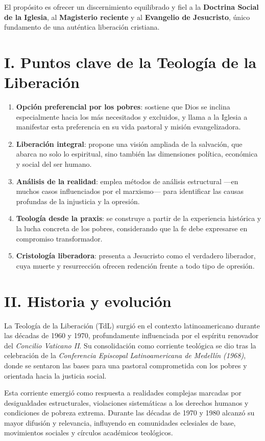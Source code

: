 \documentclass[12pt]{article}
\begin{document}
El propósito es ofrecer un discernimiento equilibrado y fiel a la \textbf{Doctrina Social de la Iglesia}, al \textbf{Magisterio reciente} y al \textbf{Evangelio de Jesucristo}, único fundamento de una auténtica liberación cristiana.

\section*{I. Puntos clave de la Teología de la Liberación}
\begin{enumerate}
    \item \textbf{Opción preferencial por los pobres}: sostiene que Dios se inclina especialmente hacia los más necesitados y excluidos, y llama a la Iglesia a manifestar esta preferencia en su vida pastoral y misión evangelizadora.
    \item \textbf{Liberación integral}: propone una visión ampliada de la salvación, que abarca no solo lo espiritual, sino también las dimensiones política, económica y social del ser humano.
    \item \textbf{Análisis de la realidad}: emplea métodos de análisis estructural —en muchos casos influenciados por el marxismo— para identificar las causas profundas de la injusticia y la opresión.
    \item \textbf{Teología desde la praxis}: se construye a partir de la experiencia histórica y la lucha concreta de los pobres, considerando que la fe debe expresarse en compromiso transformador.
    \item \textbf{Cristología liberadora}: presenta a Jesucristo como el verdadero liberador, cuya muerte y resurrección ofrecen redención frente a todo tipo de opresión.
\end{enumerate}

\section*{II. Historia y evolución}
La Teología de la Liberación (TdL) surgió en el contexto latinoamericano durante las décadas de 1960 y 1970, profundamente influenciada por el espíritu renovador del \textit{Concilio Vaticano II}. Su consolidación como corriente teológica se dio tras la celebración de la \textit{Conferencia Episcopal Latinoamericana de Medellín (1968)}, donde se sentaron las bases para una pastoral comprometida con los pobres y orientada hacia la justicia social.

Esta corriente emergió como respuesta a realidades complejas marcadas por desigualdades estructurales, violaciones sistemáticas a los derechos humanos y condiciones de pobreza extrema. Durante las décadas de 1970 y 1980 alcanzó su mayor difusión y relevancia, influyendo en comunidades eclesiales de base, movimientos sociales y círculos académicos teológicos.
\end{document}

